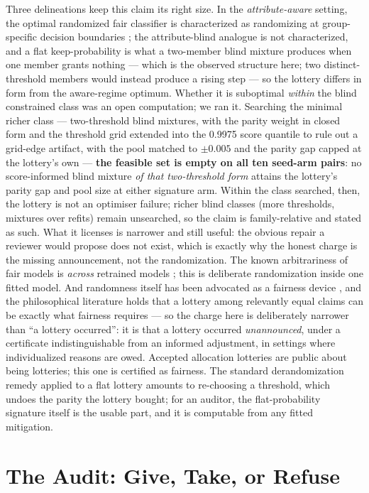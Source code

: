 \documentclass[9pt,conference]{IEEEtran}
\begin{document}
Three delineations keep this claim its right size. In the \emph{attribute-aware} setting,
the optimal randomized fair classifier is characterized as randomizing at group-specific
decision boundaries \cite{agarwal2022}; the attribute-blind analogue is not characterized,
and a flat keep-probability is what a two-member blind mixture produces when one member
grants nothing --- which is the observed structure here; two distinct-threshold members
would instead produce a rising step --- so the lottery differs in form from the
aware-regime optimum. Whether it is
suboptimal \emph{within} the blind constrained class was an open computation; we ran
it. Searching the minimal richer class --- two-threshold blind mixtures, with the
parity weight in closed form and the threshold grid extended into the 0.9975 score
quantile to rule out a grid-edge artifact, with the pool matched to $\pm 0.005$ and the
parity gap capped at the lottery's own --- \textbf{the feasible set is empty on all
ten seed-arm pairs}: no score-informed blind mixture \emph{of that two-threshold form}
attains the lottery's parity gap and pool size at either signature arm. Within the
class searched, then, the lottery is not an optimiser failure; richer blind classes
(more thresholds, mixtures over refits) remain unsearched, so the claim is
family-relative and stated as such. What it licenses is narrower and still useful:
the obvious repair a reviewer would propose does not exist, which is exactly why the
honest charge is the missing announcement, not the randomization. The known
arbitrariness of fair models is \emph{across} retrained models \cite{long2023}; this is
deliberate randomization inside one fitted model. And randomness itself has been advocated
as a fairness device \cite{grgic2017}, and the philosophical literature holds that a
lottery among relevantly equal claims can be exactly what fairness requires
\cite{broome1990,stone2011} --- so the charge here is deliberately narrower than
``a lottery occurred'': it is that a lottery occurred \emph{unannounced}, under a
certificate indistinguishable from an informed adjustment, in settings where
individualized reasons are owed. Accepted allocation lotteries are public about being
lotteries; this one is certified as fairness. The standard derandomization remedy \cite{cotter2019} applied
to a flat lottery amounts to re-choosing a threshold, which undoes the parity the lottery
bought; for an auditor, the flat-probability signature itself is the usable part, and it
is computable from any fitted mitigation.

\section{The Audit: Give, Take, or Refuse}
\label{sec:procedure}
\end{document}
